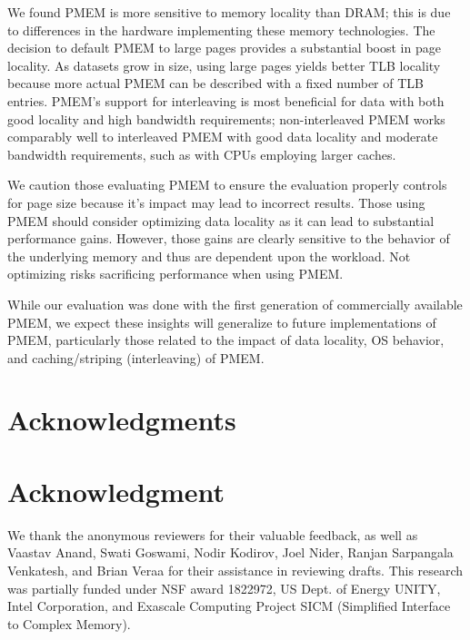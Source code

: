 \documentclass[10pt,journal,compsoc]{IEEEtran}
\begin{document}
We found PMEM is more sensitive to memory locality than DRAM; this is due to differences in the hardware implementing these memory technologies.  The decision to default PMEM to large pages provides a substantial boost in page locality.  As datasets grow in size, using large pages yields better TLB locality because more actual PMEM can be described with a fixed number of TLB entries.  PMEM's support for interleaving is most beneficial for data with both good locality and high bandwidth requirements; non-interleaved PMEM works comparably well to interleaved PMEM with good data locality and moderate bandwidth requirements, such as with CPUs employing larger caches.

We caution those evaluating PMEM to ensure the evaluation properly controls for page size because it's impact may lead to incorrect results.  Those using PMEM should consider optimizing data locality as  it can lead to substantial performance gains.  However, those gains are clearly sensitive to the behavior of the underlying memory and thus are dependent upon the workload. Not optimizing risks sacrificing performance when using PMEM.

While our evaluation was done with the first generation of commercially available PMEM, we expect these insights will generalize to future implementations of PMEM, particularly those related to the impact of data locality, OS behavior, and caching/striping (interleaving) of PMEM.


\ifCLASSOPTIONcompsoc
  \section*{Acknowledgments}
\else
  \section*{Acknowledgment}
\fi

We thank the anonymous reviewers for their valuable feedback, as well as Vaastav Anand, Swati Goswami, Nodir Kodirov, Joel Nider, Ranjan Sarpangala Venkatesh, and Brian Veraa for their assistance in reviewing drafts. This research was partially funded under NSF award 1822972, US Dept. of Energy UNITY, Intel Corporation, and Exascale Computing Project SICM (Simplified Interface to Complex Memory).

\nocite{Hunter:2007} %
\nocite{yang2019empirical} %
\nocite{peng2019system} %
\nocite{yuki2014understanding} %
\nocite{yuki2015polybench} %
\nocite{xu2016nova} %



\end{document}
